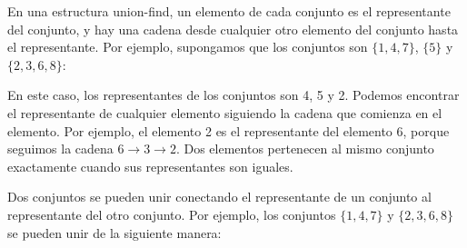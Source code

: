 En una estructura union-find, un elemento de cada conjunto
es el representante del conjunto,
y hay una cadena desde cualquier otro elemento del
conjunto hasta el representante.
Por ejemplo, supongamos que los conjuntos son
$\{1,4,7\}$, $\{5\}$ y $\{2,3,6,8\}$:
\begin{center}
\end{center}
En este caso, los representantes
de los conjuntos son 4, 5 y 2.
Podemos encontrar el representante de cualquier elemento
siguiendo la cadena que comienza en el elemento.
Por ejemplo, el elemento 2 es el representante
del elemento 6, porque
seguimos la cadena $6 \rightarrow 3 \rightarrow 2$.
Dos elementos pertenecen al mismo conjunto exactamente cuando
sus representantes son iguales.

Dos conjuntos se pueden unir conectando el
representante de un conjunto al
representante del otro conjunto.
Por ejemplo, los conjuntos
$\{1,4,7\}$ y $\{2,3,6,8\}$
se pueden unir de la siguiente manera:
\begin{center}
\end{center}

